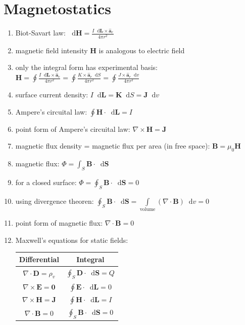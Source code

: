 \documentclass[a4paper,11pt]{article}
\newcommand*\dd{\mathop{}\!\mathrm{d}}
\newcommand{\divr}{\nabla \cdot}
\newcommand{\curl}{\nabla \times}
\newcommand{\bvec}[1]{\mathbf{#1}}
\newcommand{\uvec}[1]{\hat{\mathbf{a}}_{#1} }
\begin{document}
	\section{Magnetostatics}
	\begin{enumerate}
		\item Biot-Savart law: $\dd\bvec{H} = \frac{I \dd \bvec{L} \times \uvec{r}}{4\pi r^2}$
		\item magnetic field intensity $\bvec{H}$ is analogous to electric field
		\item only the integral form has experimental basis: $\bvec{H} = \oint \frac{I\dd\bvec{L}\times\uvec{r}}{4\pi r^2} = \oint \frac{K\times\uvec{r}\dd S}{4\pi r^2} = \oint \frac{J\times\uvec{r}\dd v}{4\pi r^2}$
		\item surface current density: $I\dd\bvec{L} = \bvec{K}\dd S = \bvec{J} \dd v$
		\item Ampere's circuital law: $\oint \bvec{H} \cdot \dd \bvec{L} = I$
		\item point form of Ampere's circuital law: $\boxed{\curl\bvec{H} = \bvec{J}}$
		\item magnetic flux density = magnetic flux per area (in free space): $\bvec{B} = \mu_0\bvec{H}$
		\item magnetic flux: $\Phi = \int_S \bvec{B}\cdot\dd\bvec{S}$
		\item for a closed surface: $\Phi = \oint_S \bvec{B}\cdot\dd\bvec{S} = 0$
		\item using divergence theoren: $\oint_S \bvec{B}\cdot\dd\bvec{S} = \int\limits_\text{volume} (\divr \bvec{B}) \dd v = 0$
		\item point form of magnetic flux: $\boxed{\divr \bvec{B} = 0}$
		\item Maxwell's equations for static fields: \\
			\begin{center}
			\begin{tabular}{|c|c|}
				\hline
				Differential & Integral \\ \hline
				$\divr \bvec{D} = \rho_v$ & $\oint_S \bvec{D} \cdot \dd\bvec{S} = Q$ \\
				$\curl \bvec{E} = \bvec{0}$ & $\oint \bvec{E} \cdot \dd \bvec{L} = 0$\\
				$\curl \bvec{H} = \bvec{J}$ & $\oint \bvec{H} \cdot \dd \bvec{L} = I$\\
				$\divr \bvec{B} = 0$ & $\oint_S \bvec{B} \cdot \dd \bvec{S} = 0$ \\ \hline
			\end{tabular}
			\end{center}

\end{enumerate}
\end{document}
